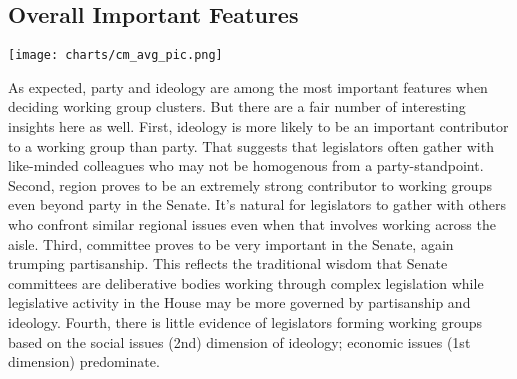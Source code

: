 \subsection{Overall Important Features}

\texttt{[image: charts/cm\_avg\_pic.png]}

As expected, party and ideology are among the most important features when deciding working group clusters. But there are a fair number of interesting insights here as well. First, ideology is more likely to be an important contributor to a working group than party. That suggests that legislators often gather with like-minded colleagues who may not be homogenous from a party-standpoint. Second, region proves to be an extremely strong contributor to working groups even beyond party in the Senate. It's natural for legislators to gather with others who confront similar regional issues even when that involves working across the aisle. Third, committee proves to be very important in the Senate, again trumping partisanship. This reflects the traditional wisdom that Senate committees are deliberative bodies working through complex legislation while legislative activity in the House may be more governed by partisanship and ideology. Fourth, there is little evidence of legislators forming working groups based on the social issues (2nd) dimension of ideology; economic issues (1st dimension) predominate.